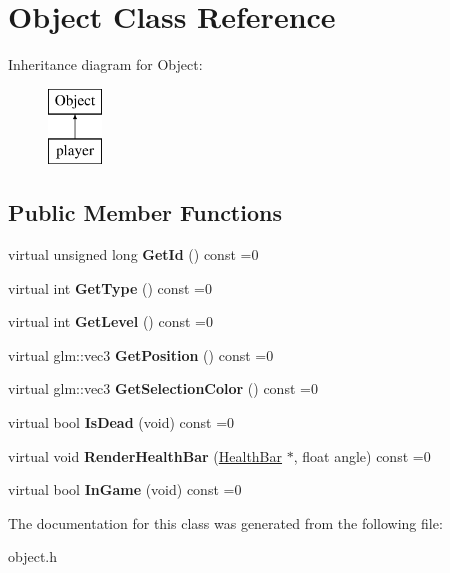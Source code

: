 \hypertarget{classObject}{\section{\-Object \-Class \-Reference}
\label{classObject}
}
\-Inheritance diagram for \-Object\-:\begin{figure}[H]
\begin{center}
\leavevmode
\includegraphics[height=2.000000cm]{classObject}
\end{center}
\end{figure}
\subsection*{\-Public \-Member \-Functions}
\begin{DoxyCompactItemize}
\item 
\hypertarget{classObject_a4b79c7788fc0162ca4313f64dc9de156}{virtual unsigned long {\bfseries \-Get\-Id} () const =0}\label{classObject_a4b79c7788fc0162ca4313f64dc9de156}

\item 
\hypertarget{classObject_a60afd7252818f9798afc2c65243f4a8e}{virtual int {\bfseries \-Get\-Type} () const =0}\label{classObject_a60afd7252818f9798afc2c65243f4a8e}

\item 
\hypertarget{classObject_accd0fb5338f2466a9e81b92e8f0a70a5}{virtual int {\bfseries \-Get\-Level} () const =0}\label{classObject_accd0fb5338f2466a9e81b92e8f0a70a5}

\item 
\hypertarget{classObject_a8104fa8c5faea8d84fe92a0b237a18a1}{virtual glm\-::vec3 {\bfseries \-Get\-Position} () const =0}\label{classObject_a8104fa8c5faea8d84fe92a0b237a18a1}

\item 
\hypertarget{classObject_a85e7dbfcb5f78934298e829c99b48b0f}{virtual glm\-::vec3 {\bfseries \-Get\-Selection\-Color} () const =0}\label{classObject_a85e7dbfcb5f78934298e829c99b48b0f}

\item 
\hypertarget{classObject_a768728f37f7446ea897d04b35915ad47}{virtual bool {\bfseries \-Is\-Dead} (void) const =0}\label{classObject_a768728f37f7446ea897d04b35915ad47}

\item 
\hypertarget{classObject_a6ef3dffccd332693d01ea57c322f1174}{virtual void {\bfseries \-Render\-Health\-Bar} (\hyperlink{classHealthBar}{\-Health\-Bar} $\ast$, float angle) const =0}\label{classObject_a6ef3dffccd332693d01ea57c322f1174}

\item 
\hypertarget{classObject_a65c6fc1c9d3b1b6ef2a173c69fcc39a1}{virtual bool {\bfseries \-In\-Game} (void) const =0}\label{classObject_a65c6fc1c9d3b1b6ef2a173c69fcc39a1}

\end{DoxyCompactItemize}


\-The documentation for this class was generated from the following file\-:\begin{DoxyCompactItemize}
\item 
object.\-h\end{DoxyCompactItemize}

